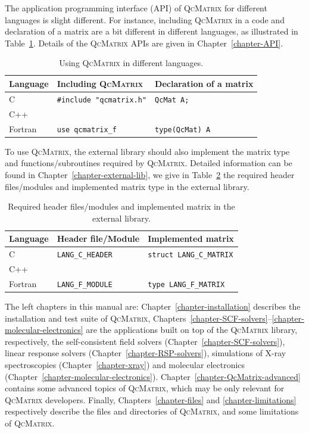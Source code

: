 \documentclass[a4paper,11pt,twoside,openright]{book}
\begin{document}
The application programming interface (API) of \textsc{QcMatrix} for different languages
is slight different. For instance, including \textsc{QcMatrix} in a code and declaration
of a matrix are a bit different in different languages, as illustrated in Table~\ref{tab-QcMatrix-use}.
Details of the \textsc{QcMatrix} APIs are given in Chapter~\ref{chapter-API}.
\begin{table}[hbtp]
  \centering
  \caption{Using \textsc{QcMatrix} in different languages.}
  \label{tab-QcMatrix-use}
  \begin{tabular}{l|l|l}
    \hline\hline
    \textbf{Language} & \textbf{Including \textsc{QcMatrix}} & \textbf{Declaration of a matrix}\\
    \hline
    C & \verb|#include "qcmatrix.h"| & \verb|QcMat A;|\\
    \hline
    C++ & &\\
    \hline
    Fortran & \verb|use qcmatrix_f| & \verb|type(QcMat) A|\\
    \hline\hline
  \end{tabular}
\end{table}

To use \textsc{QcMatrix}, the external library should also implement the matrix type
and functions/subroutines required by \textsc{QcMatrix}. Detailed information can be
found in Chapter~\ref{chapter-external-lib}, we give in Table~\ref{tab-external-req}
the required header files/modules and implemented matrix type in the external library.
\begin{table}[hbtp]
  \centering
  \caption{Required header files/modules and implemented matrix in the external
    library.}
  \label{tab-external-req}
  \begin{tabular}{l|l|l}
    \hline\hline
    \textbf{Language} & \textbf{Header file/Module} & \textbf{Implemented matrix}\\
    \hline
    C & \verb|LANG_C_HEADER| & \verb|struct LANG_C_MATRIX|\\
    \hline
    C++ & &\\
    \hline
    Fortran & \verb|LANG_F_MODULE| & \verb|type LANG_F_MATRIX|\\
    \hline\hline
  \end{tabular}
\end{table}

The left chapters in this manual are: Chapter~\ref{chapter-installation} describes the
installation and test suite of \textsc{QcMatrix},
Chapters~\ref{chapter-SCF-solvers}--\ref{chapter-molecular-electronics} are the applications
built on top of the \textsc{QcMatrix} library, respectively, the self-consistent field
solvers (Chapter~\ref{chapter-SCF-solvers}), linear response solvers (Chapter~\ref{chapter-RSP-solvers}),
simulations of X-ray spectroscopies (Chapter~\ref{chapter-xray}) and molecular electronics
(Chapter~\ref{chapter-molecular-electronics}). Chapter~\ref{chapter-QcMatrix-advanced}
contains some advanced topics of \textsc{QcMatrix}, which may be only relevant for
\textsc{QcMatrix} developers. Finally, Chapters~\ref{chapter-files} and \ref{chapter-limitations}
respectively describe the files and directories of \textsc{QcMatrix}, and some limitations
of \textsc{QcMatrix}.
\end{document}
